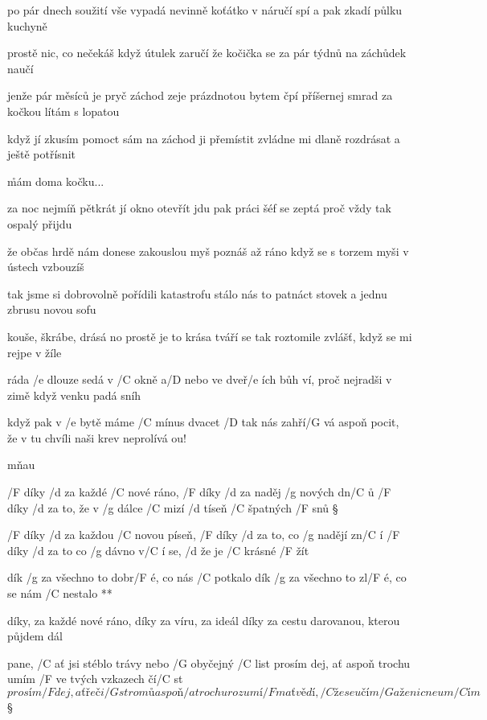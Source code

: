 po pár dnech soužití vše vypadá nevinně
koťátko v náručí spí a pak zkadí půlku kuchyně \s

prostě nic, co nečekáš když útulek zaručí
že kočička se za pár týdnů na záchůdek naučí \s

jenže pár měsíců je pryč záchod zeje prázdnotou
bytem čpí příšernej smrad za kočkou lítám s lopatou \s

když jí zkusím pomoct sám na záchod ji přemístit
zvládne mi dlaně rozdrásat a ještě potřísnit

\r mám doma kočku...

za noc nejmíň pětkrát jí okno otevřít jdu
pak práci šéf se zeptá proč vždy tak ospalý přijdu \s

že občas hrdě nám donese zakouslou myš
poznáš až ráno když se s torzem myši v ústech vzbouzíš \s

tak jsme si dobrovolně pořídili katastrofu
stálo nás to patnáct stovek a jednu zbrusu novou sofu \s

kouše, škrábe, drásá no prostě je to krása
tváří se tak roztomile zvlášť, když se mi rejpe v žíle

\rr \songgg

ráda /e dlouze sedá v /C okně a/D nebo ve dveř/e ích
bůh ví, proč nejradši v zimě když venku padá sníh

když pak v /e bytě máme /C mínus dvacet /D tak nás zahří/G vá
aspoň pocit, že v tu chvíli naši krev neprolívá
ou!

\rr

mňau




/F díky /d za každé /C nové ráno, /F díky /d za naděj /g nových dn/C ů
/F díky /d za to, že v /g dálce /C mizí /d tíseň /C špatných /F snů \S

/F díky /d za každou /C novou píseň, /F díky /d za to, co /g nadějí zn/C í
/F díky /d za to co /g dávno v/C í se, /d že je /C krásné /F žít

\R dík /g za všechno to dobr/F é, co nás /C potkalo
   dík /g za všechno to zl/F é, co se nám /C nestalo **

díky, za každé nové ráno, díky za víru, za ideál
díky za cestu darovanou, kterou půjdem dál



pane, /C ať jsi stéblo trávy nebo /G obyčejný /C list
prosím dej, ať aspoň trochu umím /F ve tvých vzkazech čí/C st
\[ prosím /F dej, ať řeči /G stromů aspoň /a trochu rozumí/F m
ať vědí, /C že se učím /G a že nic neum/C ím \] \S

